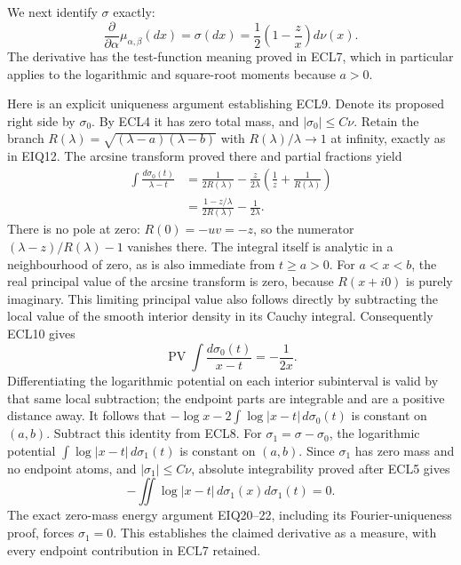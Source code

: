 \documentclass[11pt,a4paper]{article}
\begin{document}
We next identify $\sigma$ exactly:
\begin{equation}\tag{ECL9}
\boxed{\displaystyle
\frac{\partial}{\partial\alpha}\mu_{\alpha,\beta}(dx)
=\sigma(dx)=\frac12\left(1-\frac z x\right)d\nu(x).}
\end{equation}
The derivative has the test-function meaning proved in ECL7,
which in particular applies to the logarithmic and square-root
moments because $a>0$.

Here is an explicit uniqueness argument establishing ECL9.
Denote its proposed right side by $\sigma_0$.
By ECL4 it has zero total mass, and $|\sigma_0|\leq C\nu$.
Retain the branch
$R(\lambda)=\sqrt{(\lambda-a)(\lambda-b)}$ with
$R(\lambda)/\lambda\to1$ at infinity, exactly as in EIQ12.
The arcsine transform proved there and partial fractions yield
\begin{equation}\tag{ECL10}
\begin{split}
\int\frac{d\sigma_0(t)}{\lambda-t}
&=\frac1{2R(\lambda)}
-\frac z{2\lambda}
 \left(\frac1z+\frac1{R(\lambda)}\right)\\
&=\frac{1-z/\lambda}{2R(\lambda)}-\frac1{2\lambda}.
\end{split}
\end{equation}
There is no pole at zero: $R(0)=-uv=-z$, so the numerator
$(\lambda-z)/R(\lambda)-1$ vanishes there. The integral
itself is analytic in a neighbourhood of zero, as is also
immediate from $t\geq a>0$.
For $a<x<b$, the real principal value of the arcsine transform
is zero, because $R(x+i0)$ is purely imaginary. This limiting
principal value also follows directly by subtracting the local
value of the smooth interior density in its Cauchy integral.
Consequently ECL10 gives
\[
\operatorname{PV}\int\frac{d\sigma_0(t)}{x-t}=-\frac1{2x}.
\]
Differentiating the logarithmic potential on each interior
subinterval is valid by that same local subtraction; the endpoint
parts are integrable and are a positive distance away.
It follows that
$-\log x-2\int\log|x-t|\,d\sigma_0(t)$ is constant on $(a,b)$.
Subtract this identity from ECL8. For
$\sigma_1=\sigma-\sigma_0$, the logarithmic potential
$\int\log|x-t|\,d\sigma_1(t)$ is constant on $(a,b)$.
Since $\sigma_1$ has zero mass and no endpoint atoms, and
$|\sigma_1|\leq C\nu$, absolute integrability proved after ECL5 gives
\[
-\iint\log|x-t|\,d\sigma_1(x)d\sigma_1(t)=0.
\]
The exact zero-mass energy argument EIQ20--22, including its
Fourier-uniqueness proof, forces $\sigma_1=0$. This establishes
the claimed derivative as a measure, with every endpoint
contribution in ECL7 retained.
\end{document}
